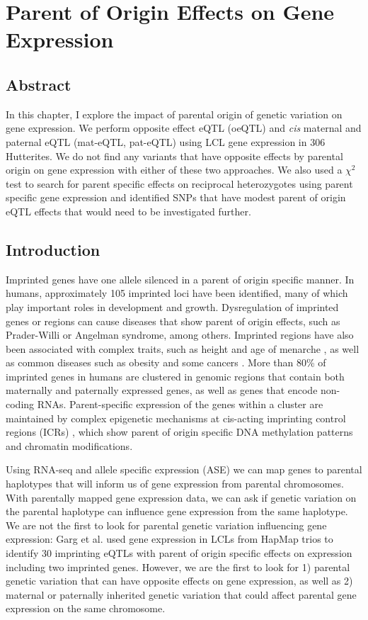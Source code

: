 
\chapter{Parent of Origin Effects on Gene Expression }\label{ch:poeqtl}
\section[Abstract]{Abstract}

In this chapter, I explore the impact of parental origin of genetic variation on gene expression. We perform opposite effect eQTL (oeQTL) and \emph{cis} maternal and paternal eQTL (mat-eQTL, pat-eQTL) using LCL gene expression in 306 Hutterites. We do not find any variants that have opposite effects by parental origin on gene expression with either of these two approaches. We also used a $\chi^2$ test to search for parent specific effects on reciprocal heterozygotes using parent specific gene expression and identified SNPs that have modest parent of origin eQTL effects that would need to be investigated further.

\section{Introduction}\label{ch04-introduction}
Imprinted genes have one allele silenced in a parent of origin specific manner. In humans, approximately 105 imprinted loci have been identified, many of which play important roles in development and growth\cite{Falls1999,Peters2014}. Dysregulation of imprinted genes or regions can cause diseases that show parent of origin effects, such as Prader-Willi or Angelman syndrome, among others\cite{Peters2014}. Imprinted regions have also been associated with complex traits, such as height and age of menarche \cite{Benonisdottir:2016dz,Zoledziewska:2015do}, as well as common diseases such as obesity and some cancers \cite{Peters2014}. More than 80\% of imprinted genes in humans are clustered in genomic regions that contain both maternally and paternally expressed genes, as well as genes that encode non-coding RNAs. Parent-specific expression of the genes within a cluster are maintained by complex epigenetic mechanisms at cis-acting imprinting control regions (ICRs) \cite{Kalish:2014gd}, which show parent of origin specific DNA methylation patterns and chromatin modifications.
	
Using RNA-seq and allele specific expression (ASE) we can map genes to parental haplotypes that will inform us of gene expression from parental chromosomes. With parentally mapped gene expression data, we can ask if genetic variation on the parental haplotype can influence gene expression from the same haplotype. We are not the first to look for parental genetic variation influencing gene expression: Garg et al. used gene expression in LCLs from HapMap trios to identify 30 imprinting eQTLs with parent of origin specific effects on expression including two imprinted genes\cite{Garg2012a}. However, we are the first to look for 1) parental genetic variation that can have opposite effects on gene expression, as well as 2) maternal or paternally inherited genetic variation that could affect parental gene expression on the same chromosome. 	

